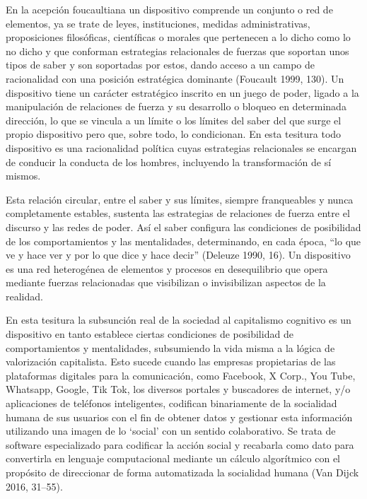 \documentclass[
]{interact}
\begin{document}
En la acepción foucaultiana un dispositivo comprende un conjunto o red
de elementos, ya se trate de leyes, instituciones, medidas
administrativas, proposiciones filosóficas, científicas o morales que
pertenecen a lo dicho como lo no dicho y que conforman estrategias
relacionales de fuerzas que soportan unos tipos de saber y son
soportadas por estos, dando acceso a un campo de racionalidad con una
posición estratégica dominante (Foucault 1999, 130). Un dispositivo
tiene un carácter estratégico inscrito en un juego de poder, ligado a la
manipulación de relaciones de fuerza y su desarrollo o bloqueo en
determinada dirección, lo que se vincula a un límite o los límites del
saber del que surge el propio dispositivo pero que, sobre todo, lo
condicionan. En esta tesitura todo dispositivo es una racionalidad
política cuyas estrategias relacionales se encargan de conducir la
conducta de los hombres, incluyendo la transformación de sí mismos.

Esta relación circular, entre el saber y sus límites, siempre
franqueables y nunca completamente estables, sustenta las estrategias de
relaciones de fuerza entre el discurso y las redes de poder. Así el
saber configura las condiciones de posibilidad de los comportamientos y
las mentalidades, determinando, en cada época, ``lo que ve y hace ver y
por lo que dice y hace decir'' (Deleuze 1990, 16). Un dispositivo es una
red heterogénea de elementos y procesos en desequilibrio que opera
mediante fuerzas relacionadas que visibilizan o invisibilizan aspectos
de la realidad.

En esta tesitura la subsunción real de la sociedad al capitalismo
cognitivo es un dispositivo en tanto establece ciertas condiciones de
posibilidad de comportamientos y mentalidades, subsumiendo la vida misma
a la lógica de valorización capitalista. Esto sucede cuando las empresas
propietarias de las plataformas digitales para la comunicación, como
Facebook, X Corp., You Tube, Whatsapp, Google, Tik Tok, los diversos
portales y buscadores de internet, y/o aplicaciones de teléfonos
inteligentes, codifican binariamente de la socialidad humana de sus
usuarios con el fin de obtener datos y gestionar esta información
utilizando una imagen de lo `social' con un sentido colaborativo. Se
trata de software especializado para codificar la acción social y
recabarla como dato para convertirla en lenguaje computacional mediante
un cálculo algorítmico con el propósito de direccionar de forma
automatizada la socialidad humana (Van Dijck 2016, 31--55).
\end{document}
